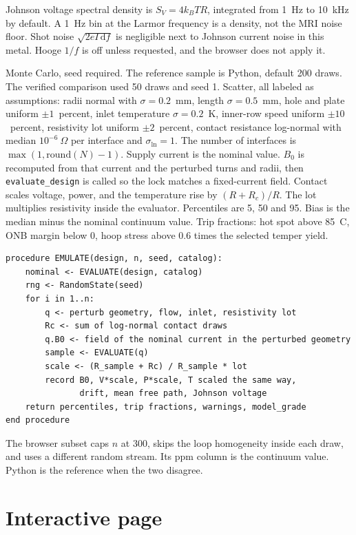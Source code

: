 \documentclass[11pt]{article}
\begin{document}
Johnson voltage spectral density is $S_V=4k_B T R$, integrated from 1~Hz to 10~kHz by default.
A 1~Hz bin at the Larmor frequency is a density, not the MRI noise floor.
Shot noise $\sqrt{2e I\,\mathrm{d}f}$ is negligible next to Johnson current noise in this metal.
Hooge $1/f$ is off unless requested, and the browser does not apply it.

Monte Carlo, seed required.
The reference sample is Python, default 200 draws.
The verified comparison used 50 draws and seed 1.
Scatter, all labeled as assumptions: radii normal with $\sigma=0.2$~mm, length $\sigma=0.5$~mm, hole and plate uniform $\pm 1$~percent, inlet temperature $\sigma=0.2$~K, inner-row speed uniform $\pm 10$~percent, resistivity lot uniform $\pm 2$~percent, contact resistance log-normal with median $10^{-6}~\Omega$ per interface and $\sigma_{\ln}=1$.
The number of interfaces is $\max(1,\mathrm{round}(N)-1)$.
Supply current is the nominal value.
$B_0$ is recomputed from that current and the perturbed turns and radii, then \texttt{evaluate\_design} is called so the lock matches a fixed-current field.
Contact scales voltage, power, and the temperature rise by $(R+R_c)/R$.
The lot multiplies resistivity inside the evaluator.
Percentiles are 5, 50 and 95.
Bias is the median minus the nominal continuum value.
Trip fractions: hot spot above 85~C, ONB margin below 0, hoop stress above 0.6 times the selected temper yield.

\begin{verbatim}
procedure EMULATE(design, n, seed, catalog):
    nominal <- EVALUATE(design, catalog)
    rng <- RandomState(seed)
    for i in 1..n:
        q <- perturb geometry, flow, inlet, resistivity lot
        Rc <- sum of log-normal contact draws
        q.B0 <- field of the nominal current in the perturbed geometry
        sample <- EVALUATE(q)
        scale <- (R_sample + Rc) / R_sample * lot
        record B0, V*scale, P*scale, T scaled the same way,
               drift, mean free path, Johnson voltage
    return percentiles, trip fractions, warnings, model_grade
end procedure
\end{verbatim}

The browser subset caps $n$ at 300, skips the loop homogeneity inside each draw, and uses a different random stream.
Its ppm column is the continuum value.
Python is the reference when the two disagree.

\section{Interactive page}
\end{document}
